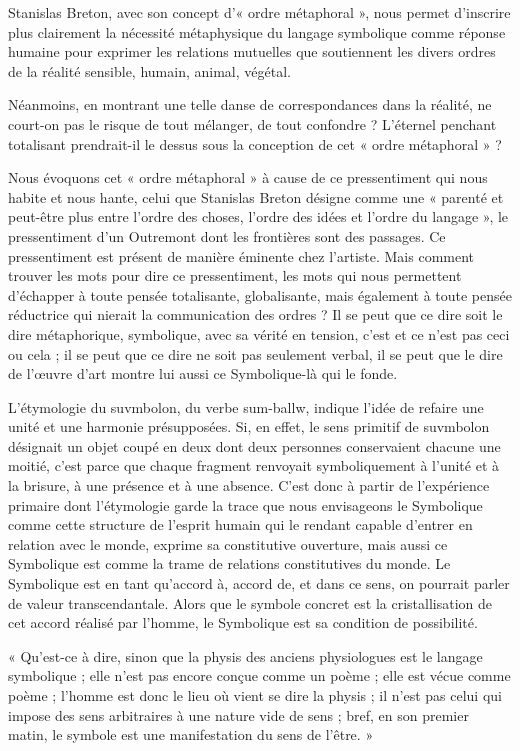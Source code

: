 Stanislas Breton, avec son concept d’« ordre métaphoral », nous permet d’inscrire plus clairement la nécessité métaphysique du langage symbolique comme réponse humaine pour exprimer les relations mutuelles que soutiennent les divers ordres de la réalité sensible, humain, animal, végétal.

Néanmoins, en montrant une telle danse de correspondances dans la réalité, ne court-on pas le risque de tout mélanger, de tout confondre ? L’éternel penchant totalisant prendrait-il le dessus sous la conception de cet « ordre métaphoral » ?

Nous évoquons cet « ordre métaphoral » à cause de ce pressentiment qui nous habite et nous hante, celui que Stanislas Breton désigne comme une « parenté et peut-être plus entre l’ordre des choses, l’ordre des idées et l’ordre du langage », le pressentiment d’un Outremont dont les frontières sont des passages. Ce pressentiment est présent de manière éminente chez l’artiste. Mais comment trouver les mots pour dire ce pressentiment, les mots qui nous permettent d’échapper à toute pensée totalisante, globalisante, mais également à toute pensée réductrice qui nierait la communication des ordres ? Il se peut que ce dire soit le dire métaphorique, symbolique, avec sa vérité en tension, c’est et ce n’est pas ceci ou cela ; il se peut que ce dire ne soit pas seulement verbal, il se peut que le dire de l’œuvre d’art montre lui aussi ce Symbolique-là qui le fonde.

L’étymologie du suvmbolon, du verbe sum-ballw, indique l’idée de refaire une unité et une harmonie présupposées. Si, en effet, le sens primitif de suvmbolon désignait un objet coupé en deux dont deux personnes conservaient chacune une moitié, c’est parce que chaque fragment renvoyait symboliquement à l’unité et à la brisure, à une présence et à une absence. C’est donc à partir de l’expérience primaire dont l’étymologie garde la trace que nous envisageons le Symbolique comme cette structure de l’esprit humain qui le rendant capable d’entrer en relation avec le monde, exprime sa constitutive ouverture, mais aussi ce Symbolique est comme la trame de relations constitutives du monde. Le Symbolique est en tant qu’accord à, accord de, et dans ce sens, on pourrait parler de valeur transcendantale. Alors que le symbole concret est la cristallisation de cet accord réalisé par l’homme, le Symbolique est sa condition de possibilité.

\vspace{0.24cm}
{\footnotesize « Qu’est-ce à dire, sinon que la physis des anciens physiologues est le langage symbolique ; elle n’est pas encore conçue comme un poème ; elle est vécue comme poème ; l’homme est donc le lieu où vient se dire la physis ; il n’est pas celui qui impose des sens arbitraires à une nature vide de sens ; bref, en son premier matin, le symbole est une manifestation du sens de l’être. »}
\vspace{0.31cm}

